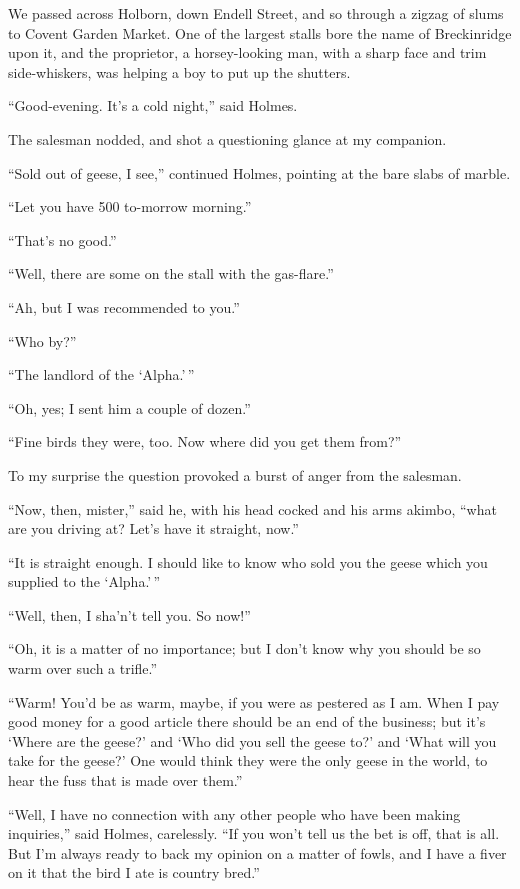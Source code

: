 We passed across Holborn, down Endell Street, and so
through a zigzag of slums to Covent Garden Market. One
of the largest stalls bore the name of Breckinridge upon it,
and the proprietor, a horsey-looking man, with a sharp face
and trim side-whiskers, was helping a boy to put up the
shutters.

“Good-evening. It’s a cold night,” said Holmes.

The salesman nodded, and shot a questioning glance at my
companion.

“Sold out of geese, I see,” continued Holmes, pointing at
the bare slabs of marble.

“Let you have 500 to-morrow morning.”

“That’s no good.”

“Well, there are some on the stall with the gas-flare.”

“Ah, but I was recommended to you.”

“Who by?”

“The landlord of the ‘Alpha.’\,”

“Oh, yes; I sent him a couple of dozen.”

“Fine birds they were, too. Now where did you get them
from?”

To my surprise the question provoked a burst of anger
from the salesman.

“Now, then, mister,” said he, with his head cocked and his
arms akimbo, “what are you driving at? Let’s have it
straight, now.”

“It is straight enough. I should like to know who sold
you the geese which you supplied to the ‘Alpha.’\,”

“Well, then, I sha’n’t tell you. So now!”

“Oh, it is a matter of no importance; but I don’t know
why you should be so warm over such a trifle.”

“Warm! You’d be as warm, maybe, if you were as pestered
as I am. When I pay good money for a good article
there should be an end of the business; but it’s ‘Where are
the geese?’ and ‘Who did you sell the geese to?’ and ‘What will
you take for the geese?’ One would think they were the only
geese in the world, to hear the fuss that is made over them.”

“Well, I have no connection with any other people who
have been making inquiries,” said Holmes, carelessly. “If
you won’t tell us the bet is off, that is all. But I’m always
ready to back my opinion on a matter of fowls, and I have a
fiver on it that the bird I ate is country bred.”

